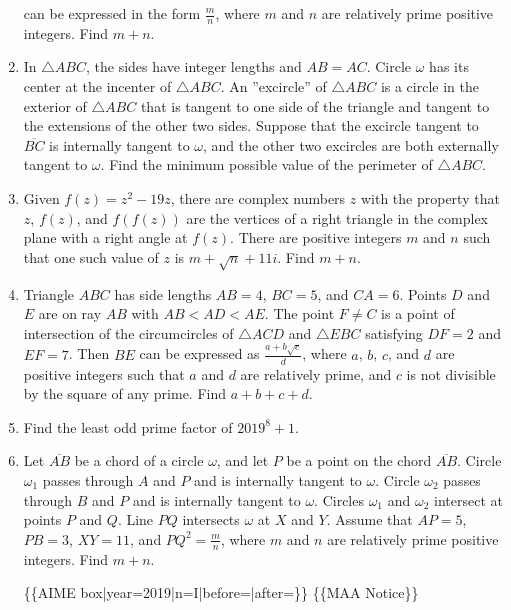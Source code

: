 \documentclass{article}
\begin{document}
\begin{enumerate}[label=\arabic*., itemsep=0.5em]
can be expressed in the form \(\tfrac{m}{n}\), where \(m\) and \(n\) are relatively prime positive integers. Find \(m+n\).\par \vspace{0.5em}\item In \(\triangle ABC\), the sides have integer lengths and \(AB=AC\). Circle \(\omega\) has its center at the incenter of \(\triangle ABC\). An ''excircle'' of \(\triangle ABC\) is a circle in the exterior of \(\triangle ABC\) that is tangent to one side of the triangle and tangent to the extensions of the other two sides. Suppose that the excircle tangent to \(\overline{BC}\) is internally tangent to \(\omega\), and the other two excircles are both externally tangent to \(\omega\). Find the minimum possible value of the perimeter of \(\triangle ABC\).\par \vspace{0.5em}\item Given \(f(z) = z^2-19z\), there are complex numbers \(z\) with the property that \(z\), \(f(z)\), and \(f(f(z))\) are the vertices of a right triangle in the complex plane with a right angle at \(f(z)\). There are positive integers \(m\) and \(n\) such that one such value of \(z\) is \(m+\sqrt{n}+11i\). Find \(m+n\).\par \vspace{0.5em}\item Triangle \(ABC\) has side lengths \(AB=4\), \(BC=5\), and \(CA=6\). Points \(D\) and \(E\) are on ray \(AB\) with \(AB<AD<AE\). The point \(F \neq C\) is a point of intersection of the circumcircles of \(\triangle ACD\) and \(\triangle EBC\) satisfying \(DF=2\) and \(EF=7\). Then \(BE\) can be expressed as \(\tfrac{a+b\sqrt{c}}{d}\), where \(a\), \(b\), \(c\), and \(d\) are positive integers such that \(a\) and \(d\) are relatively prime, and \(c\) is not divisible by the square of any prime. Find \(a+b+c+d\).\par \vspace{0.5em}\item Find the least odd prime factor of \(2019^8 + 1\).\par \vspace{0.5em}\item Let \(\overline{AB}\) be a chord of a circle \(\omega\), and let \(P\) be a point on the chord \(\overline{AB}\). Circle \(\omega_1\) passes through \(A\) and \(P\) and is internally tangent to \(\omega\). Circle \(\omega_2\) passes through \(B\) and \(P\) and is internally tangent to \(\omega\). Circles \(\omega_1\) and \(\omega_2\) intersect at points \(P\) and \(Q\). Line \(PQ\) intersects \(\omega\) at \(X\) and \(Y\). Assume that \(AP=5\), \(PB=3\), \(XY=11\), and \(PQ^2 = \tfrac{m}{n}\), where \(m\) and \(n\) are relatively prime positive integers. Find \(m+n\).



\{\{AIME box|year=2019|n=I|before=|after=\}\}
\{\{MAA Notice\}\}\par \vspace{0.5em}
\end{enumerate}
\end{document}
